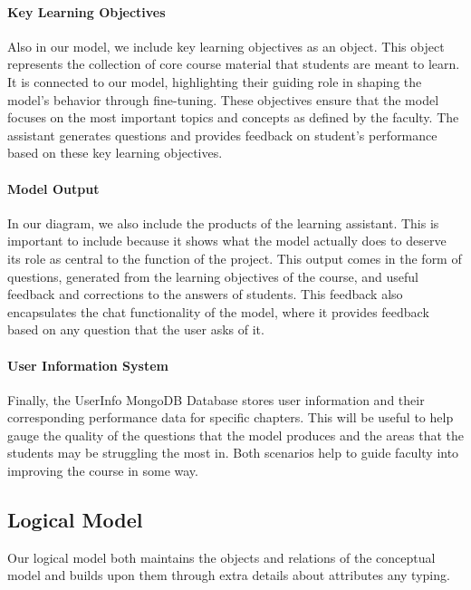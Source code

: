 \documentclass[12pt,a4paper]{article}
\begin{document}
    \paragraph{Key Learning Objectives}
    Also in our model, we include key learning objectives as an object.  This object represents the
    collection of core course material that students are meant to learn.  It is connected to our model,
    highlighting their guiding role in shaping the model's behavior through fine-tuning. These
    objectives ensure that the model focuses on the most important topics and concepts as defined by
    the faculty. The assistant generates questions and provides feedback on student's performance
    based on these key learning objectives.

    \paragraph{Model Output}
    In our diagram, we also include the products of the learning assistant.  This is important to include
    because it shows what the model actually does to deserve its role as central to the function of
    the project.  This output comes in the form of questions, generated from the learning objectives
    of the course, and useful feedback and corrections to the answers of students.  This feedback also
    encapsulates the chat functionality of the model, where it provides feedback based on any question
    that the user asks of it.

    \paragraph{User Information System}
    Finally, the UserInfo MongoDB Database stores user information and their corresponding performance
    data for specific chapters.  This will be useful to help gauge the quality of the questions that
    the model produces and the areas that the students may be struggling the most in.  Both scenarios
    help to guide faculty into improving the course in some way.

    
    \subsection{Logical Model}
    
    Our logical model both maintains the objects and relations of the conceptual model and builds upon
    them through extra details about attributes any typing.
\end{document}
